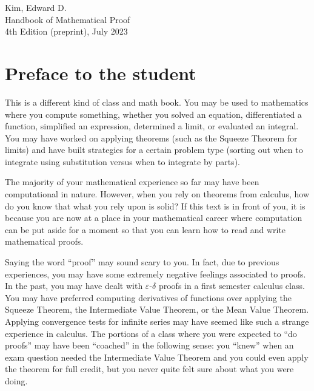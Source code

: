 \documentclass{book}
\theoremstyle{ekimcustom}
\begin{document}
\vskip24pt\noindent
Kim, Edward D.\\
Handbook of Mathematical Proof\\
4th Edition (preprint), July 2023

%


\tableofcontents

\chapter*{Preface to the student}

This is a different kind of class and math book. You may be used to mathematics where you compute something, whether you solved an equation, differentiated a function, simplified an expression, determined a limit, or evaluated an integral. You may have worked on applying theorems (such as the Squeeze Theorem for limits) and have built strategies for a certain problem type (sorting out when to integrate using substitution versus when to integrate by parts).

The majority of your mathematical experience so far may have been computational in nature. However, when you rely on theorems from calculus, how do you know that what you rely upon is solid? If this text is in front of you, it is because you are now at a place in your mathematical career where computation can be put aside for a moment so that you can learn how to read and write mathematical proofs.

Saying the word ``proof'' may sound scary to you. In fact, due to previous experiences, you may have some extremely negative feelings associated to proofs. In the past, you may have dealt with $\varepsilon$-$\delta$ proofs in a first semester calculus class. You may have preferred computing derivatives of functions over applying the Squeeze Theorem, the Intermediate Value Theorem, or the Mean Value Theorem. Applying convergence tests for infinite series may have seemed like such a strange experience in calculus. The portions of a class where you were expected to ``do proofs'' may have been ``coached'' in the following sense: you ``knew'' when an exam question needed the Intermediate Value Theorem and you could even apply the theorem for full credit, but you never quite felt sure about what you were doing.
\end{document}
